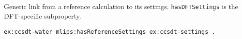 Generic link from a reference calculation to its settings. \texttt{hasDFTSettings} is the DFT-specific subproperty.
\begin{lstlisting}[language=turtle]
ex:ccsdt-water mlips:hasReferenceSettings ex:ccsdt-settings .
\end{lstlisting}
